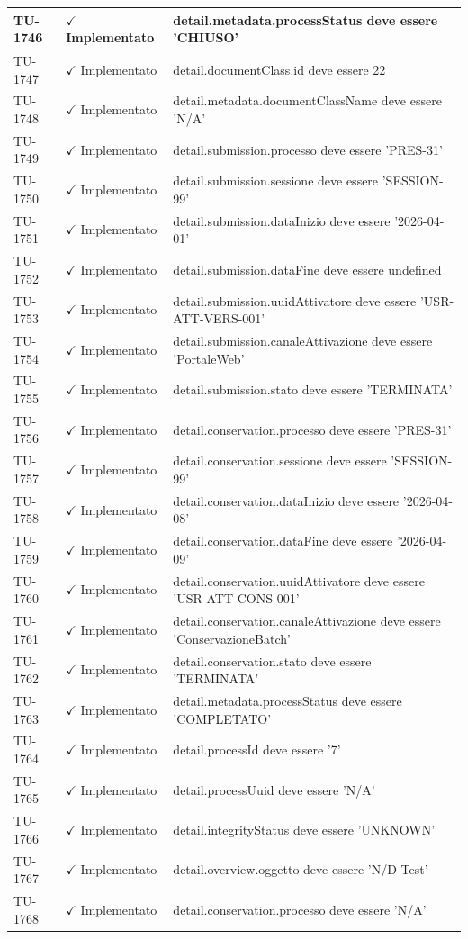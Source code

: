 ﻿\documentclass[a4paper,12pt]{article}
\newcommand{\ok}{\textcolor{green!60!black}{$\checkmark$ Implementato}}
\begin{document}
\begin{longtable}{|p{2cm}|p{3.5cm}|p{9.5cm}|}
\hline
TU-1746 & \ok & detail.metadata.processStatus deve essere 'CHIUSO' \\
\hline
TU-1747 & \ok & detail.documentClass.id deve essere 22 \\
\hline
TU-1748 & \ok & detail.metadata.documentClassName deve essere 'N/A' \\
\hline
TU-1749 & \ok & detail.submission.processo deve essere 'PRES-31' \\
\hline
TU-1750 & \ok & detail.submission.sessione deve essere 'SESSION-99' \\
\hline
TU-1751 & \ok & detail.submission.dataInizio deve essere '2026-04-01' \\
\hline
TU-1752 & \ok & detail.submission.dataFine deve essere undefined \\
\hline
TU-1753 & \ok & detail.submission.uuidAttivatore deve essere 'USR-ATT-VERS-001' \\
\hline
TU-1754 & \ok & detail.submission.canaleAttivazione deve essere 'PortaleWeb' \\
\hline
TU-1755 & \ok & detail.submission.stato deve essere 'TERMINATA' \\
\hline
TU-1756 & \ok & detail.conservation.processo deve essere 'PRES-31' \\
\hline
TU-1757 & \ok & detail.conservation.sessione deve essere 'SESSION-99' \\
\hline
TU-1758 & \ok & detail.conservation.dataInizio deve essere '2026-04-08' \\
\hline
TU-1759 & \ok & detail.conservation.dataFine deve essere '2026-04-09' \\
\hline
TU-1760 & \ok & detail.conservation.uuidAttivatore deve essere 'USR-ATT-CONS-001' \\
\hline
TU-1761 & \ok & detail.conservation.canaleAttivazione deve essere 'ConservazioneBatch' \\
\hline
TU-1762 & \ok & detail.conservation.stato deve essere 'TERMINATA' \\
\hline
TU-1763 & \ok & detail.metadata.processStatus deve essere 'COMPLETATO' \\
\hline
TU-1764 & \ok & detail.processId deve essere '7' \\
\hline
TU-1765 & \ok & detail.processUuid deve essere 'N/A' \\
\hline
TU-1766 & \ok & detail.integrityStatus deve essere 'UNKNOWN' \\
\hline
TU-1767 & \ok & detail.overview.oggetto deve essere 'N/D Test' \\
\hline
TU-1768 & \ok & detail.conservation.processo deve essere 'N/A' \\

\end{longtable}
\end{document}
